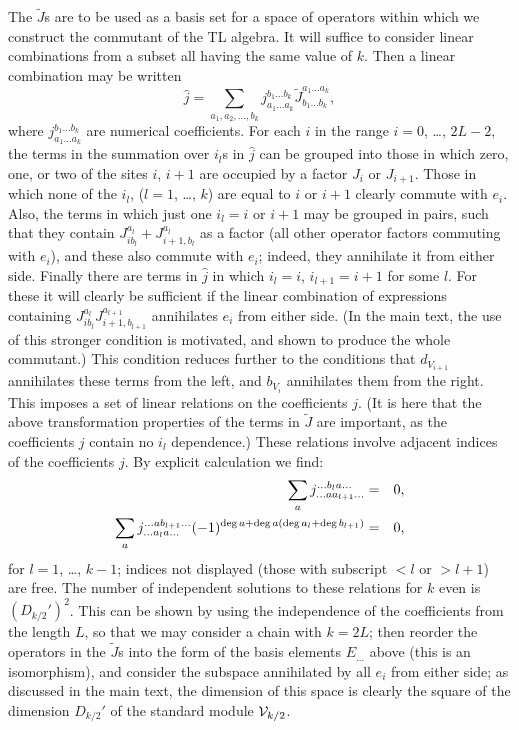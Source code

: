 \documentclass[twocolumn,floats,pra]{revtex4}
\newcommand {\be}{\begin{equation}}
\newcommand {\ee} {\end{equation}}
\newcommand {\bea}{\begin{eqnarray}}
\newcommand {\eea} {\end{eqnarray}}
\begin{document}
The $\widetilde{J}$s are to be used as a basis set for a space of
operators within which we construct the commutant of the TL
algebra. It will suffice to consider linear combinations from a
subset all having the same value of $k$. Then a linear combination
may be written %
\be%
\widehat{j}=\sum_{a_1,a_2,\ldots,b_k}j_{a_1\ldots a_k}^{b_1\ldots
b_k}\widetilde{J}^{a_1\ldots a_k}_{b_1\ldots b_k},\ee%
where $j_{a_1\ldots a_k}^{b_1\ldots b_k}$ are numerical
coefficients. For each $i$ in the range $i=0$, \ldots, $2L-2$, the
terms in the summation over $i_l$s in $\widehat{j}$ can be grouped
into those in which zero, one, or two of the sites $i$, $i+1$  are
occupied by a factor $J_i$ or $J_{i+1}$. Those in which none of
the $i_l$, ($l=1$, \ldots, $k$) are equal to $i$ or $i+1$ clearly
commute with $e_i$. Also, the terms in which just one $i_l=i$ or
$i+1$ may be grouped in pairs, such that they contain
$J_{ib_l}^{a_l}+J_{i+1,b_l}^{a_l}$ as a factor (all other operator
factors commuting with $e_i$), and these also commute with $e_i$;
indeed, they annihilate it from either side. Finally there are
terms in $\widehat{j}$ in which $i_l=i$, $i_{l+1}=i+1$ for some
$l$. For these it will clearly be sufficient if the linear
combination of expressions containing
$J_{ib_l}^{a_l}J_{i+1,b_{l+1}}^{a_{l+1}}$ annihilates $e_i$ from
either side. (In the main text, the use of this stronger condition
is motivated, and shown to produce the whole commutant.) This
condition reduces further to the conditions that $d_{V_{i+1}}$
annihilates these terms from the left, and $b_{V_i}$ annihilates
them from the right. This imposes a set of linear relations on the
coefficients $j$. (It is here that the above transformation
properties of the terms in $\widetilde{J}$ are important, as the
coefficients $j$ contain no $i_l$ dependence.) These relations
involve adjacent indices of the
coefficients $j$. By explicit calculation we find:%
\bea%
\sum_{a}j^{\ldots b_l a\ldots}_{\ldots a a_{l+1}\ldots}&=&0,\label{jrel1}\\
\sum_{a}j^{\ldots a b_{l+1}\ldots}_{\ldots a_l a\ldots}(-1)^{{\rm
deg}\,a +{\rm deg}\,a({\rm deg}\,a_l+{\rm deg}\,b_{l+1})}
&=&0,\label{jrel2} \eea for $l=1$, \ldots, $k-1$; indices not
displayed (those with subscript $<l$ or $>l+1$) are free. The
number of independent solutions to these relations for $k$ even is
$(D_{k/2}')^2$. This can be shown by using the independence of the
coefficients from the length $L$, so that we may consider a chain
with $k=2L$; then reorder the operators in the $\widetilde{J}$s
into the form of the basis elements $E_{\ldots}$ above (this is an
isomorphism), and consider the subspace annihilated by all $e_i$
from either side; as discussed in the main text, the dimension of
this space is clearly the square of the dimension $D_{k/2}'$ of
the standard module ${\cal V}_{k/2}$.
\end{document}
